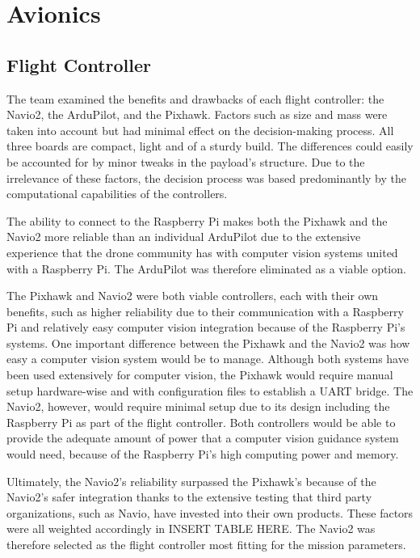 	\section{Avionics}\label{PL:Design:Avionics}
		\subsection{Flight Controller}
		The team examined the benefits and drawbacks of each flight controller: the Navio2, the ArduPilot, and the Pixhawk. Factors such as size and mass were taken into account but had minimal effect on the decision-making process. All three boards are compact, light and of a sturdy build. The differences could easily be accounted for by minor tweaks in the payload’s structure. Due to the irrelevance of these factors, the decision process was based predominantly by the computational capabilities of the controllers. 

		The ability to connect to the Raspberry Pi makes both the Pixhawk and the Navio2 more reliable than an individual ArduPilot due to the extensive experience that the drone community has with computer vision systems united with a Raspberry Pi. The ArduPilot was therefore eliminated as a viable option. 
		
		The Pixhawk and Navio2 were both viable controllers, each with their own benefits, such as higher reliability due to their communication with a Raspberry Pi and relatively easy computer vision integration because of the Raspberry Pi’s systems. One important difference between the Pixhawk and the Navio2 was how easy a computer vision system would be to manage. Although both systems have been used extensively for computer vision, the Pixhawk would require manual setup hardware-wise and with configuration files to establish a UART bridge. The Navio2, however, would require minimal setup due to its design including the Raspberry Pi as part of the flight controller. Both controllers would be able to provide the adequate amount of power that a computer vision guidance system would need, because of the Raspberry Pi’s high computing power and memory. 
		
		Ultimately, the Navio2’s reliability surpassed the Pixhawk’s because of the Navio2’s safer integration thanks to the extensive testing that third party organizations, such as Navio, have invested into their own products. These factors were all weighted accordingly in INSERT TABLE HERE. The Navio2 was therefore selected as the flight controller most fitting for the mission parameters. 

